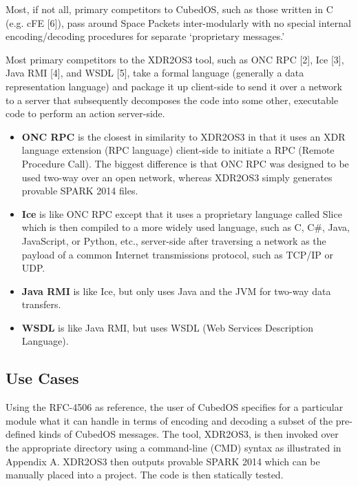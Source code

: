 Most, if not all, primary competitors to CubedOS, such as those written in C (e.g. cFE [6]),
pass around Space Packets inter-modularly with no special internal encoding/decoding procedures
for separate ‘proprietary messages.’

Most primary competitors to the XDR2OS3 tool, such as ONC RPC [2], Ice [3], Java RMI [4], and
WSDL [5], take a formal language (generally a data representation language) and package it up
client-side to send it over a network to a server that subsequently decomposes the code into
some other, executable code to perform an action server-side.

\begin{itemize}
\item \textbf{ONC RPC} is the closest in similarity to XDR2OS3 in that it uses an XDR language
  extension (RPC language) client-side to initiate a RPC (Remote Procedure Call). The biggest
  difference is that ONC RPC was designed to be used two-way over an open network, whereas
  XDR2OS3 simply generates provable SPARK 2014 files.

\item \textbf{Ice} is like ONC RPC except that it uses a proprietary language called Slice which
  is then compiled to a more widely used language, such as C, C\#, Java, JavaScript, or Python,
  etc., server-side after traversing a network as the payload of a common Internet transmissions
  protocol, such as TCP/IP or UDP.

\item \textbf{Java RMI} is like Ice, but only uses Java and the JVM for two-way data transfers.

\item \textbf{WSDL} is like Java RMI, but uses WSDL (Web Services Description Language).
\end{itemize}

\subsection{Use Cases}

Using the RFC-4506 as reference, the user of CubedOS specifies for a particular module what it
can handle in terms of encoding and decoding a subset of the pre-defined kinds of CubedOS
messages. The tool, XDR2OS3, is then invoked over the appropriate directory using a command-line
(CMD) syntax as illustrated in Appendix A. XDR2OS3 then outputs provable SPARK 2014 which can be
manually placed into a project. The code is then statically tested.

